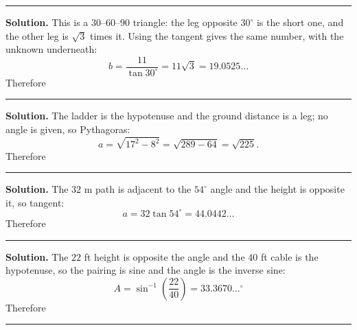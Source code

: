 \documentclass[12pt]{article}
\begin{document}
\vspace{0.15cm}\noindent\rule{\linewidth}{0.2pt}


\noindent\textbf{Solution.} This is a $30$--$60$--$90$ triangle: the leg opposite
$30^\circ$ is the short one, and the other leg is $\sqrt{3}$ times it. Using the
tangent gives the same number, with the unknown underneath:
\[ b = \frac{11}{\tan 30^\circ} = 11\sqrt{3} = 19.0525\ldots \]
Therefore 

\vspace{0.15cm}\noindent\rule{\linewidth}{0.2pt}


\noindent\textbf{Solution.} The ladder is the hypotenuse and the ground distance
is a leg; no angle is given, so Pythagoras:
\[ a = \sqrt{17^2 - 8^2} = \sqrt{289 - 64} = \sqrt{225} . \]
Therefore 

\vspace{0.15cm}\noindent\rule{\linewidth}{0.2pt}


\noindent\textbf{Solution.} The $32$ m path is adjacent to the $54^\circ$ angle
and the height is opposite it, so tangent:
\[ a = 32 \tan 54^\circ = 44.0442\ldots \]
Therefore 

\vspace{0.15cm}\noindent\rule{\linewidth}{0.2pt}


\noindent\textbf{Solution.} The $22$ ft height is opposite the angle and the
$40$ ft cable is the hypotenuse, so the pairing is sine and the angle is the
inverse sine:
\[ A = \sin^{-1}\!\left(\frac{22}{40}\right) = 33.3670\ldots^\circ \]
Therefore 

\vspace{0.15cm}\noindent\rule{\linewidth}{0.2pt}

\end{document}
